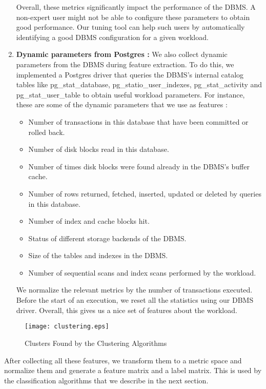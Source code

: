 \begin{enumerate}
{  Overall, these metrics significantly impact the performance of the DBMS. A
  non-expert user might not be able to configure these parameters to obtain
  good performance. Our tuning tool can help such users by automatically
  identifying a good DBMS configuration for a given workload.  
  }
  
  \item {\textbf{Dynamic parameters from Postgres :}
  We also collect dynamic parameters from the DBMS during feature extraction.
  To do this, we implemented a Postgres driver that queries the DBMS's internal
  catalog tables like pg\_stat\_database, pg\_statio\_user\_indexes,
  pg\_stat\_activity and pg\_stat\_user\_table
  to obtain useful workload parameters. For instance, these are some of the
  dynamic parameters that we use as features :\\
  
  \begin{itemize}    
    \item {Number of transactions in this database that have been committed or
    rolled back.}
    \item {Number of disk blocks read in this database.}
    \item {Number of times disk blocks were found already in the DBMS's buffer
    cache.}
    \item {Number of rows returned, fetched, inserted, updated or deleted by
    queries in this database.}
    \item {Number of index and cache blocks hit.}
    \item {Status of different storage backends of the DBMS.}
    \item {Size of the tables and indexes in the DBMS.}
    \item {Number of sequential scans and index scans performed by the
    workload.}
  \end{itemize}
  
  	We normalize the relevant metrics by the number of transactions executed.
  	Before the start of an execution, we reset all the statistics using our
  	DBMS driver. Overall, this gives us a nice set of features about the
  	workload. }
\end{enumerate}

\begin{figure*}
    \centering
    \texttt{[image: clustering.eps]}
    \caption{Clusters Found by the Clustering Algorithms}
    \label{fig:clusters}
\end{figure*}

After collecting all these features, we transform them to a metric space and
normalize them and generate a feature matrix and a label matrix. This is 
used by the classification algorithms that we describe in the next section.

